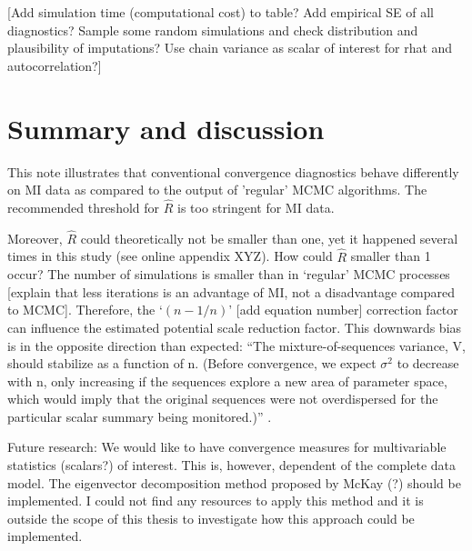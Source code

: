 \documentclass[article]{jss}
\begin{document}
[Add simulation time (computational cost) to table? Add empirical SE of all diagnostics? Sample some random simulations and check distribution and plausibility of imputations? Use chain variance as scalar of interest for rhat and autocorrelation?]








\section{Summary and discussion} \label{sec:summary}

This note illustrates that conventional convergence diagnostics behave differently on MI data as compared to the output of 'regular' MCMC algorithms. The recommended threshold for $\widehat{R}$ is too stringent for MI data.

Moreover, $\widehat{R}$ could theoretically not be smaller than one, yet it happened several times in this study (see online appendix XYZ). How could $\widehat{R}$ smaller than 1 occur? The number of simulations is smaller than in `regular' MCMC processes [explain that less iterations is an advantage of MI, not a disadvantage compared to MCMC]. Therefore, the `$(n-1/n)$' [add equation number] correction factor can influence the estimated potential scale reduction factor. This downwards bias is in the opposite direction than expected: ``The mixture-of-sequences variance, V, should stabilize as a function of n. (Before convergence, we expect $\sigma^2$ to decrease with n, only increasing if the sequences explore a new area of parameter space, which would imply that the original sequences were not overdispersed for the particular scalar summary being monitored.)'' \cite[p~438]{broo98}.


Future research: We would like to have convergence measures for multivariable statistics (scalars?) of interest. This is, however, dependent of the complete data model. The eigenvector decomposition method proposed by McKay (?) should be implemented. I could not find any resources to apply this method and it is outside the scope of this thesis to investigate how this approach could be implemented.
\end{document}
